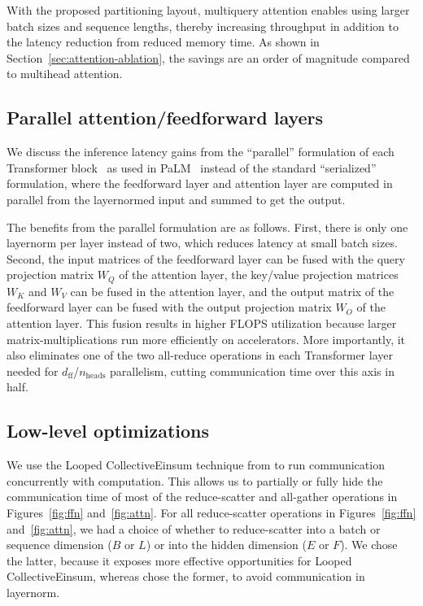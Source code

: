 With the proposed partitioning layout, multiquery attention enables using larger batch sizes and sequence lengths, thereby increasing throughput in addition to the latency reduction from reduced memory time. As shown in Section~\ref{sec:attention-ablation}, the savings are an order of magnitude compared to multihead attention.

\subsection{Parallel attention/feedforward layers}\label{sec:parallel-layers}
We discuss the inference latency gains from the ``parallel'' formulation of each Transformer block~\citep{gpt-j} as used in PaLM~\cite{chowdhery2022palm} instead of the standard ``serialized'' formulation, where the feedforward layer and attention layer are computed in parallel from the layernormed input and summed to get the output.

The benefits from the parallel formulation are as follows. First, there is only one layernorm per layer instead of two, which reduces latency at small batch sizes. Second, the input matrices of the feedforward layer can be fused with the query projection matrix $W_Q$ of the attention layer, the key/value projection matrices $W_K$ and $W_V$ can be fused in the attention layer, and the output matrix of the feedforward layer can be fused with the output projection matrix $W_O$ of the attention layer. This fusion results in higher FLOPS utilization because larger matrix-multiplications run more efficiently on accelerators. More importantly, it also eliminates one of the two all-reduce operations in each Transformer layer needed for $d_{\textrm{ff}}$/$n_{\textrm{heads}}$ parallelism, cutting communication time over this axis in half. 

\subsection{Low-level optimizations}\label{sec:lowlevel}

We use the Looped CollectiveEinsum technique from \cite{wang2023collectivematmul} to run communication concurrently with computation. This allows us to partially or fully hide the communication time of most of the reduce-scatter and all-gather operations in Figures~\ref{fig:ffn} and~\ref{fig:attn}. For all reduce-scatter operations in Figures~\ref{fig:ffn} and~\ref{fig:attn}, we had a choice of whether to reduce-scatter into a batch or sequence dimension ($B$ or $L$) or into the hidden dimension ($E$ or $F$). We chose the latter, because it exposes more effective opportunities for Looped CollectiveEinsum, whereas \citet{korthikanti2022reducing} chose the former, to avoid communication in layernorm.

